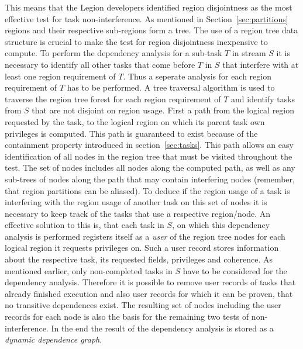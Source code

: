 \documentclass{article}      %
\begin{document}
This means that the Legion developers identified region disjointness as the most effective test for task non-interference. As mentioned in Section~\ref{sec:partitions} regions and their respective sub-regions form a tree. The use of a region tree data structure is crucial to make the test for region disjointness inexpensive to compute. To perform the dependency analysis for a sub-task $T$ in stream $S$ it is necessary to identify all other tasks that come before $T$ in $S$ that interfere with at least one region requirement of $T$. Thus a seperate analysis for each region requirement of $T$ has to be performed. A tree traversal algorithm is used to traverse the region tree forest for each region requirement of $T$ and identify tasks from $S$ that are not disjoint on region usage. First a path from the logical region requested by the task, to the logical region on which its parent task own privileges is computed. This path is guaranteed to exist because of the containment property introduced in section~\ref{sec:tasks}. This path allows an easy identification of all nodes in the region tree that must be visited throughout the test. The set of nodes includes all nodes along the computed path, as well as any sub-trees of nodes along the path that may contain interfering nodes (remember, that region partitions can be aliased). To deduce if the region usage of a task is interfering with the region usage of another task on this set of nodes it is necessary to keep track of the tasks that use a respective region/node. An effective solution to this is, that each task in $S$, on which this dependency analysis is performed registers itself as a \emph{user} of the region tree nodes for each logical region it requests privileges on. Such a user record stores information about the respective task, its requested fields, privileges and coherence. As mentioned earlier, only non-completed tasks in $S$ have to be considered for the dependency analysis. Therefore it is possible to remove user records of tasks that already finished execution and also user records for which it can be proven, that no transitive dependences exist. The resulting set of nodes including the user records for each node is also the basis for the remaining two tests of non-interference. In the end the result of the dependency analysis is stored as a \emph{dynamic dependence graph}.
\end{document}
